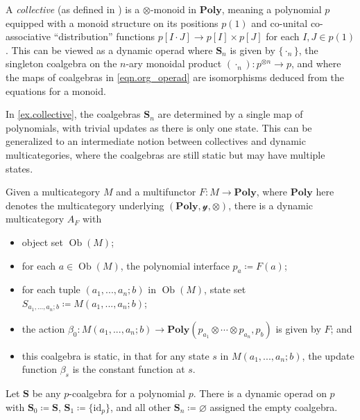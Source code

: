 \documentclass[11pt, one side, article]{memoir}
\theoremstyle{definition}
\theoremstyle{plain}
\newenvironment{example}
  {\pushQED{\qed}\renewcommand{\qedsymbol}{$\lozenge$}\examplex}
  {\popQED\endexamplex}
\DeclareMathOperator{\ob}{Ob}
\newcommand{\Cat}[1]{\mathbf{#1}}%
\newcommand{\id}{\mathrm{id}}
\newcommand{\yon}{\mathcal{y}}
\newcommand{\poly}{\Cat{Poly}}
\newcommand{\0}{\textsf{0}}
\newcommand{\1}{\tn{\textsf{1}}}
\renewcommand{\S}{{\Cat{S}}}
\newcommand{\idcoalg}[1]{{\{\id_{#1}\}}}
\begin{document}
\begin{example}\label{ex.collective}
A \emph{collective} (as defined in \cite{niu2021collectives}) is a $\otimes$-monoid in $\poly$, meaning a polynomial $p$ equipped with a monoid structure on its positions $p(1)$ and co-unital co-associative ``distribution'' functions $p[I \cdot J] \to p[I] \times p[J]$ for each $I,J \in p(1)$. This can be viewed as a dynamic operad where $\S_n$ is given by $\{\cdot_n\}$, the singleton coalgebra on the $n$-ary monoidal product $(\cdot_n)\colon p^{\otimes n} \to p$, and where the maps of coalgebras in \eqref{eqn.org_operad} are isomorphisms deduced from the equations for a monoid.
\end{example}

\begin{example}
In \cref{ex.collective}, the coalgebras $\S_n$ are determined by a single map of polynomials, with trivial updates as there is only one state. This can be generalized to an intermediate notion between collectives and dynamic multicategories, where the coalgebras are still static but may have multiple states.

Given a multicategory $M$ and a multifunctor $F\colon M \to\poly$, where $\poly$ here denotes the multicategory underlying $(\poly,\yon,\otimes)$, there is a dynamic multicategory $A_F$ with 
\begin{itemize}
	\item object set $\ob(M)$;
	\item for each $a \in \ob(M)$, the polynomial interface $p_a \coloneqq F(a)$;
	\item for each tuple $(a_1,...,a_n;b)$ in $\ob(M)$, state set $S_{a_1,...,a_n;b} \coloneqq M(a_1,...,a_n;b)$;
	\item the action $\beta_0\colon M(a_1,...,a_n;b) \to \poly(p_{a_1} \otimes \cdots \otimes p_{a_n},p_b)$ is given by $F$; and 
	\item this coalgebra is static, in that for any state $s$ in $M(a_1,...,a_n;b)$, the update function $\beta_s$ is the constant function at $s$.
	\qedhere
\end{itemize}
\end{example}

\begin{example}
Let $\S$ be any $p$-coalgebra for a polynomial $p$. There is a dynamic operad on $p$ with $\S_0\coloneqq \S$, $\S_1\coloneqq\idcoalg{p}$, and all other $\S_n\coloneqq\varnothing$ assigned the empty coalgebra.
\end{example}
\end{document}
